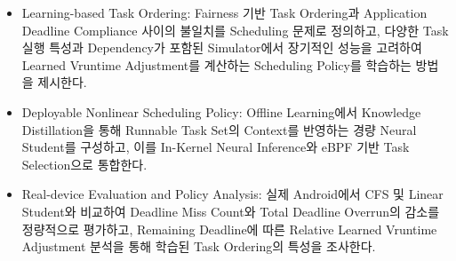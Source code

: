 \begin{itemize}
    \item Learning-based Task Ordering:
    Fairness 기반 Task Ordering과 Application Deadline Compliance
    사이의 불일치를 Scheduling 문제로 정의하고,
    다양한 Task 실행 특성과 Dependency가 포함된 Simulator에서
    장기적인 성능을 고려하여 Learned Vruntime Adjustment를
    계산하는 Scheduling Policy를 학습하는 방법을 제시한다.

    \item Deployable Nonlinear Scheduling Policy:
    Offline Learning에서 Knowledge Distillation을 통해
    Runnable Task Set의 Context를 반영하는 경량 Neural Student를
    구성하고, 이를 In-Kernel Neural Inference와 eBPF 기반
    Task Selection으로 통합한다.

    \item Real-device Evaluation and Policy Analysis:
    실제 Android에서 CFS 및 Linear Student와 비교하여
    Deadline Miss Count와 Total Deadline Overrun의 감소를 정량적으로
    평가하고, Remaining Deadline에 따른 Relative Learned Vruntime Adjustment
    분석을 통해 학습된 Task Ordering의 특성을 조사한다.
\end{itemize}